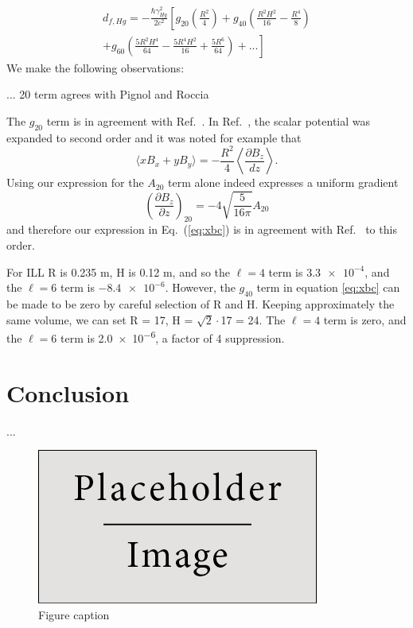 \documentclass[preprint,12pt]{elsarticle}
\begin{document}
\begin{multline}
    d_{f,Hg} = -\frac{\hbar\gamma_{Hg}^{2}}{2c^{2}}\left[g_{20}\left(\frac{R^{2}}{4}\right)+g_{40}\left(\frac{R^{2}H^{2}}{16}-\frac{R^{4}}{8}\right)\right.\\
    +\left.g_{60}\left(\frac{5R^{2}H^{4}}{64}-\frac{5R^{4}H^{2}}{16}+\frac{5R^{6}}{64}\right)+...\right]
\end{multline}
We make the following observations:

... 20 term agrees with Pignol and Roccia

The $g_{20}$ term is in agreement with Ref.~\cite{bib:pignol}.  In
Ref.~\cite{bib:pignol}, the scalar potential was expanded to second
order and it was noted for example that
\begin{equation}
  \langle xB_x+yB_y\rangle=-\frac{R^2}{4}\left\langle\frac{\partial B_z}{dz}\right\rangle.
\end{equation}
Using our expression for the $A_{20}$ term alone indeed expresses a
uniform gradient
\begin{equation}
  \left(\frac{\partial B_z}{\partial
    z}\right)_{20}=-4\sqrt{\frac{5}{16\pi}}A_{20}
\end{equation}
and therefore our expression in Eq.~(\ref{eq:xbc}) is in agreement with
Ref.~\cite{bib:pignol} to this order.

For ILL R is 0.235 m, H is 0.12 m, and so the $\ell=4$ term is $\num{3.3e-4}$, and the $\ell=6$ term is $\num{-8.4e-6}$.  However, the $g_{40}$ term in equation \ref{eq:xbc} can be made to be zero by careful selection of R and H.  Keeping approximately the same volume, we can set R = 17, H = $\sqrt{2}\cdot$17 = 24.  The $\ell=4$ term is zero, and the $\ell=6$ term is \num{2.0e-6}, a factor of 4 suppression.


\section{Conclusion}

...


\begin{figure}[h]
\centering\includegraphics[width=0.4\linewidth]{placeholder}
\caption{Figure caption}
\end{figure}
\end{document}
